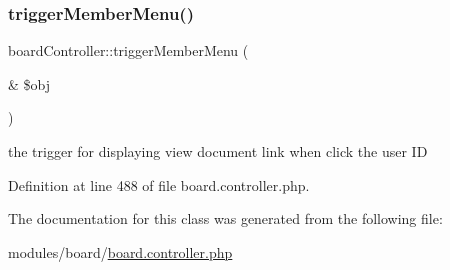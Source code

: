 \subsubsection{\texorpdfstring{trigger\+Member\+Menu()}{triggerMemberMenu()}}
{\footnotesize\ttfamily board\+Controller\+::trigger\+Member\+Menu (\begin{DoxyParamCaption}\item[{\&}]{\$obj }\end{DoxyParamCaption})}



the trigger for displaying \textquotesingle{}view document\textquotesingle{} link when click the user ID 



Definition at line 488 of file board.\+controller.\+php.



The documentation for this class was generated from the following file\+:\begin{DoxyCompactItemize}
\item 
modules/board/\hyperlink{board_8controller_8php}{board.\+controller.\+php}\end{DoxyCompactItemize}
